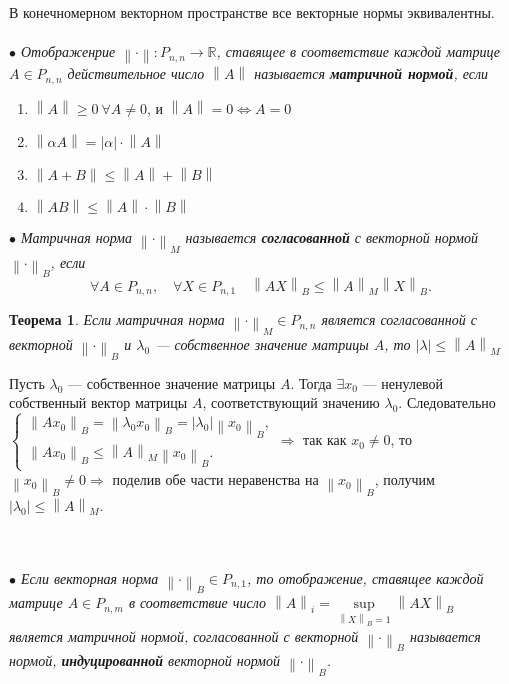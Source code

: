 В конечномерном векторном пространстве все векторные нормы эквивалентны.\\\\
\textit{$\bullet$ Отображенрие $\left \| \cdot \right \|:P_{n,n} \rightarrow \mathbb{R}$, ставящее в соответствие каждой матрице $A\in P_{n,n}$ действительное число $\left \| A \right \|$ называется \textbf{матричной нормой}, если}
\begin{enumerate}
	\item $\left \|A\right \| \geqslant 0\ \forall A\ne 0$, и $\left \|A\right \| = 0 \Leftrightarrow A = 0$
	\item $\left \|\alpha A\right \|=|\alpha|\cdot\left \|A\right \|$
	\item  $\left \|A+B\right \| \leqslant \left \|A\right \| + \left \|B\right \|$
	\item $\left \|AB\right \| \leqslant \left \|A\right \|\cdot  \left \|B\right \|$
\end{enumerate}
\textit{$\bullet$ Матричная норма $\left \|\cdot\right \|_M$ называется \textbf{согласованной} с векторной нормой $\left \|\cdot\right \|_B$, если} $$\forall A\in P_{n,n},\quad \forall X \in P_{n,1}\quad \left \|AX\right \|_B\leqslant \left \|A\right \|_M\left \|X\right \|_B.$$
\newtheorem*{th14_10_1}{Теорема}\begin{th14_10_1}Если матричная норма $\left \|\cdot\right \|_M \in P_{n,n}$ является согласованной с векторной $\left \|\cdot\right \|_B$ и $\lambda_0$ --- собственное значение матрицы $A$, то $|\lambda| \leqslant \left \|A\right \|_M$
\end{th14_10_1}\begin{Proof}
	Пусть $\lambda_0$ --- собственное значение матрицы $A$. Тогда $\exists x_0$ --- ненулевой собственный вектор матрицы $A$, соответствующий значению $\lambda_0$. Следовательно\\
	$\begin{cases}
		\left \|Ax_0\right \|_B = \left \|\lambda_0 x_0\right \|_B = |\lambda_0| \left \|x_0\right \|_B,\\
		\left \|A x_0\right \|_B \leqslant \left \|A\right \|_M \left \| x_0\right \|_B.
	\end{cases} \Rightarrow$ так как $x_0\ne 0$, то $\left \| x_0\right \|_B \ne 0\Rightarrow$ поделив обе части неравенства на $\left \| x_0\right \|_B$, получим $|\lambda_0|\leqslant \left \|A\right \|_M$.
\end{Proof}\\\\
\textit{$\bullet$ Если векторная норма $\left \|\cdot\right \|_B\in P_{n,1}$, то отображение, ставящее каждой матрице $A\in P_{n,m}$ в соответствие число $\left \|A\right \|_i = \underset{\left \|X\right \|_B = 1}{\sup} \left \|AX\right \|_B$ является матричной нормой, согласованной с векторной $\left \|\cdot\right \|_B$ называется нормой, \textbf{индуцированной} векторной нормой $\left \|\cdot\right \|_B$.}
